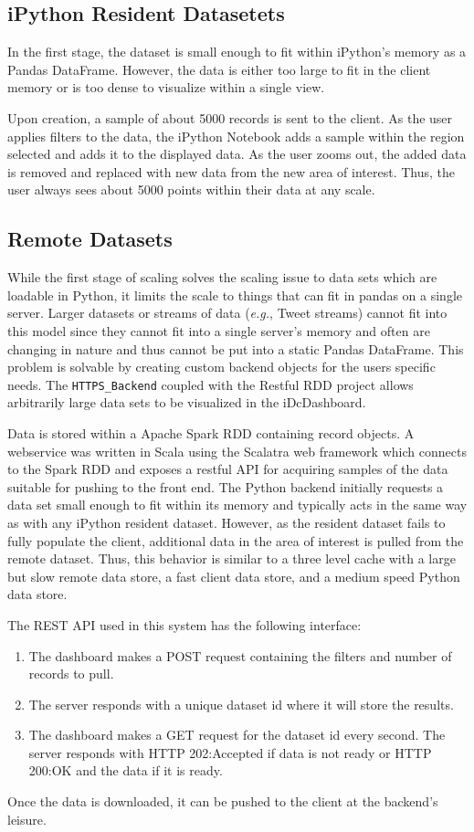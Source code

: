 \documentclass[letter,twocolumn]{article}
\begin{document}
\subsection{iPython Resident Datasetets}
In the first stage, the dataset is small enough to fit within iPython's memory as a Pandas DataFrame.
However, the data is either too large to fit in the client memory or is too dense to visualize within a single view.

Upon creation, a sample of about 5000 records is sent to the client.
As the user applies filters to the data, the iPython Notebook adds a sample within the region selected and adds it to the displayed data.
As the user zooms out, the added data is removed and replaced with new data from the new area of interest.
Thus, the user always sees about 5000 points within their data at any scale.

\subsection{Remote Datasets}\label{sec:big_data_remote}

While the first stage of scaling solves the scaling issue to data sets which are loadable in Python, it limits the scale to things that can fit in pandas on a single server.
Larger datasets or streams of data (\emph{e.g.}, Tweet streams) cannot fit into this model since they cannot fit into a single server's memory and often are changing in nature and thus cannot be put into a static Pandas DataFrame.
This problem is solvable by creating custom backend objects for the users specific needs.
The {\tt HTTPS\_Backend} coupled with the Restful RDD project allows arbitrarily large data sets to be visualized in the iDcDashboard.

Data is stored within a Apache Spark RDD containing record objects.  A webservice was written in Scala using the Scalatra web framework which connects to the Spark RDD and exposes a restful API for acquiring samples of the data suitable for pushing to the front end.  
The Python backend initially requests a data set small enough to fit within its memory and typically acts in the same way as with any iPython resident dataset.
However, as the resident dataset fails to fully populate the client, additional data in the area of interest is pulled from the remote dataset.
Thus, this behavior is similar to a three level cache with a large but slow remote data store, a fast client data store, and a medium speed Python data store.

The REST API used in this system has the following interface:
\begin{enumerate}
	\item The dashboard makes a POST request containing the filters and number of records to pull.
	\item The server responds with a unique dataset id where it will store the results.
	\item The dashboard makes a GET request for the dataset id every second. 
	The server responds with HTTP 202:Accepted if data is not ready or HTTP 200:OK and the data if it is ready.
\end{enumerate}
Once the data is downloaded, it can be pushed to the client at the backend's leisure.
\end{document}
